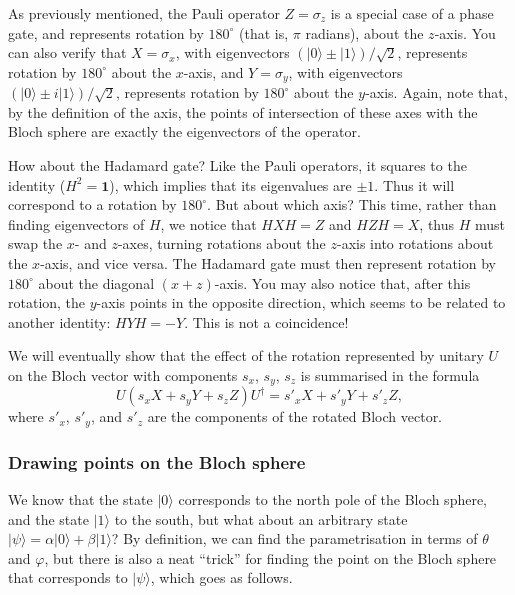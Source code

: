 \documentclass[fleqn]{article}
\begin{document}
As previously mentioned, the Pauli operator \(Z=\sigma_z\) is a special case of a phase gate, and represents rotation by \({180}^{\circ}\) (that is, \(\pi\) radians), about the \(z\)-axis.
You can also verify that \(X=\sigma_x\), with eigenvectors \({(|0\rangle\pm|1\rangle)/\sqrt{2}}\), represents rotation by \({180}^{\circ}\) about the \(x\)-axis, and \(Y=\sigma_y\), with eigenvectors \({(|0\rangle\pm i|1\rangle)/\sqrt{2}}\), represents rotation by \({180}^{\circ}\) about the \(y\)-axis.
Again, note that, by the definition of the axis, the points of intersection of these axes with the Bloch sphere are exactly the eigenvectors of the operator.

How about the Hadamard gate?
Like the Pauli operators, it squares to the identity (\(H^2=\mathbf{1}\)), which implies that its eigenvalues are \(\pm 1\).
Thus it will correspond to a rotation by \({180}^{\circ}\).
But about which axis?
This time, rather than finding eigenvectors of \(H\), we notice that \(HXH=Z\) and \(HZH=X\), thus \(H\) must swap the \(x\)- and \(z\)-axes, turning rotations about the \(z\)-axis into rotations about the \(x\)-axis, and vice versa.
The Hadamard gate must then represent rotation by \({180}^{\circ}\) about the diagonal \((x+z)\)-axis.
You may also notice that, after this rotation, the \(y\)-axis points in the opposite direction, which seems to be related to another identity: \(HYH=-Y\).
This is not a coincidence!

We will eventually show that the effect of the rotation represented by unitary \(U\) on the Bloch vector with components \(s_x\), \(s_y\), \(s_z\) is summarised in the formula
\[
  U (s_x X + s_y Y + s_z Z) U^\dagger
  = s'_x X+ s'_y Y + s'_z Z,
\]
where \(s'_x\), \(s'_y\), and \(s'_z\) are the components of the rotated Bloch vector.

\hypertarget{drawing-points-on-the-bloch-sphere}{%
\subsubsection{Drawing points on the Bloch sphere}\label{drawing-points-on-the-bloch-sphere}}

We know that the state \(|0\rangle\) corresponds to the north pole of the Bloch sphere, and the state \(|1\rangle\) to the south, but what about an arbitrary state \(|\psi\rangle=\alpha|0\rangle+\beta|1\rangle\)?
By definition, we can find the parametrisation in terms of \(\theta\) and \(\varphi\), but there is also a neat ``trick'' for finding the point on the Bloch sphere that corresponds to \(|\psi\rangle\), which goes as follows.
\end{document}
